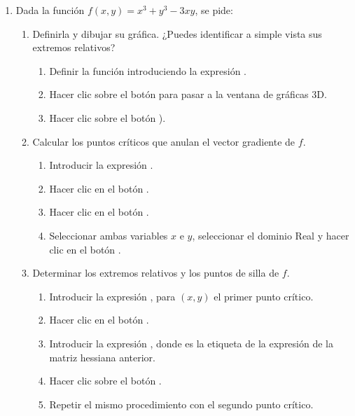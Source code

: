 \begin{enumerate}[leftmargin=*]
\item Dada la función $f(x,y)=x^3+y^3-3xy$, se pide:
\begin{enumerate}
\item Definirla y dibujar su gráfica. ¿Puedes identificar a simple vista sus extremos relativos?
\begin{indicacion}
{\begin{enumerate}
\item Definir la función introduciendo la expresión .
\item Hacer clic sobre el botón  para pasar a la ventana de gráficas 3D.
\item Hacer clic sobre el botón ).
\end{enumerate}
}
\end{indicacion}

\item Calcular los puntos críticos que anulan el vector gradiente de $f$. 
\begin{indicacion}
{\begin{enumerate}
\item Introducir la expresión .
\item Hacer clic en el botón .
\item Hacer clic en el botón .
\item Seleccionar ambas variables $x$ e $y$, seleccionar el dominio Real y hacer clic en el botón .
\end{enumerate}
}
\end{indicacion}

\item Determinar los extremos relativos y los puntos de silla de $f$.
\begin{indicacion}
{\begin{enumerate}
\item Introducir la expresión , para $(x,y)$ el primer punto crítico.
\item Hacer clic en el botón .
\item Introducir la expresión , donde  es la etiqueta de la expresión de la matriz
hessiana anterior.
\item Hacer clic sobre el botón .
\item Repetir el mismo procedimiento con el segundo punto crítico. 
\end{enumerate}
}
\end{indicacion}
\end{enumerate}

\end{enumerate}



